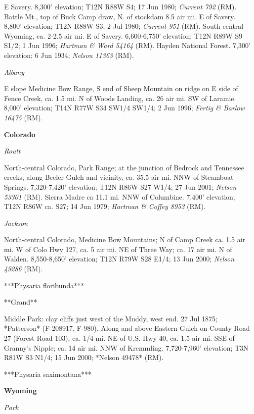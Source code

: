 E Savery.  8,300’ elevation; T12N R88W S4; 17 Jun 1980; \textit{Current 792} (RM).  Battle Mt., top of Buck Camp draw, N. of stockdam 8.5 air mi. E of Savery.  8,800’ elevation; T12N R88W S3; 2 Jul 1980; \textit{Current 951} (RM).  South-central Wyoming, ca. 2-2.5 air mi. E of Savery.  6,600-6,750’ elevation; T12N R89W S9 S1/2; 1 Jun 1996; \textit{Hartman \& Ward 54164} (RM).  Hayden National Forest.  7,300' elevation; 6 Jun 1934; \textit{Nelson 11363} (RM).  

\textit{Albany}

E slope Medicine Bow Range, S end of Sheep Mountain on ridge on E side of Fence Creek, ca. 1.5 mi. N of Woods Landing, ca. 26 air mi. SW of Laramie. 8,000' elevation; T14N R77W S34 SW1/4 SW1/4; 2 Jun 1996; \textit{Fertig \& Barlow 16475} (RM).

\textbf{Colorado} %

\textit{Routt}

North-central Colorado, Park Range; at the junction of Bedrock and Tennessee creeks, along Beeler Gulch and vicinity, ca. 35.5 air mi. NNW of Steamboat Springs. 7,320-7,420' elevation; T12N R86W S27 W1/4; 27 Jun 2001; \textit{Nelson 53301} (RM).  Sierra Madre ca 11.1 mi. NNW of Columbine.  7,400' elevation; T12N R86W ca. S27; 14 Jun 1979; \textit{Hartman \& Coffey 8953} (RM). 

\textit{Jackson}

North-central Colorado, Medicine Bow Mountains; N of Camp Creek ca. 1.5 air mi. W of Colo Hwy 127, ca. 5 air mi. NE of Three Way; ca. 17 air mi. N of Walden.  8,550-8,650' elevation; T12N R79W S28 E1/4; 13 Jun 2000; \textit{Nelson 49286} (RM).

***Physaria floribunda***

**Grand**

Middle Park: clay cliffs just west of the Muddy, west end. 27 Jul 1875; *Patterson* (F-208917, F-980).  Along and above Eastern Gulch on County Road 27 (Forest Road 103), ca. 1/4 mi. NE of U.S. Hwy 40, ca. 1.5 air mi. SSE of Granny's Nipple; ca. 14 air mi. NNW of Kremmling. 7,720-7,960' elevation; T3N R81W S3 N1/4; 15 Jun 2000; *Nelson 49478* (RM).  


***Physaria saximontana***

\textbf{Wyoming} %

\textit{Park}

